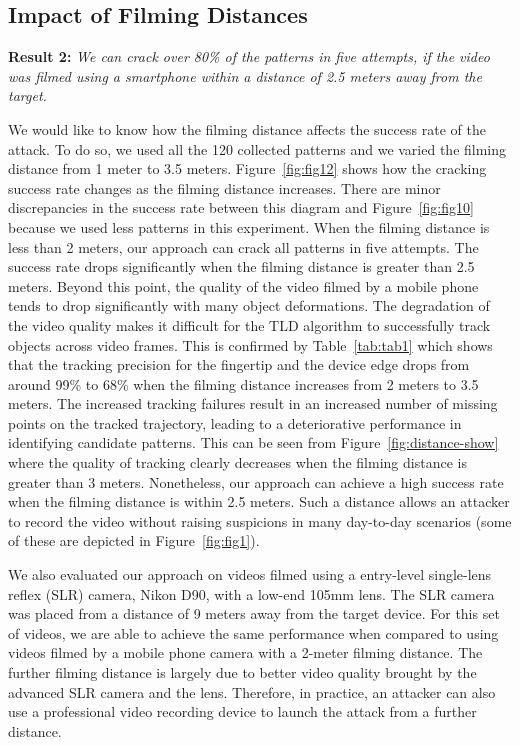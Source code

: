     \subsection{Impact of Filming Distances \label{sec:distances}}


        \noindent \textbf{Result 2:} \emph{We can crack over 80\% of the patterns in five attempts, if the video was filmed using a smartphone within a distance of 2.5 meters away from the target.}

           We would like to know how the filming distance affects the
           success rate of the attack. To do so, we used all the 120 collected patterns and we varied the
           filming distance from 1 meter to 3.5 meters.
           Figure~\ref{fig:fig12} shows how the cracking success rate changes
           as the filming distance increases. There are minor discrepancies in the success rate between this diagram and Figure~\ref{fig:fig10}
            because we used less patterns in this experiment.
           When the filming distance is less than 2 meters, our approach can crack all patterns in five attempts.
           The success rate drops significantly when
           the filming distance is greater than 2.5 meters.
           Beyond this point, the quality of the video filmed by a mobile phone tends to drop significantly with many object deformations. The degradation of the video quality makes it difficult for the TLD algorithm to successfully track objects across video frames.
            This is confirmed by Table~\ref{tab:tab1}
           which shows that the tracking precision for the fingertip and the device edge drops from around 99\% to
           68\% when the filming
           distance increases from 2 meters to 3.5 meters. The increased
           tracking failures result in an increased number of missing
           points on the tracked trajectory, leading to a deteriorative performance in identifying candidate patterns.
           This can be seen from Figure~\ref{fig:distance-show} where the quality
           of tracking clearly decreases when the filming distance is greater
           than 3 meters.
           Nonetheless, our approach can
           achieve a high success rate when the filming distance is within
           2.5 meters. Such a distance allows an attacker to
           record the video without raising suspicions in many day-to-day scenarios (some of these are
           depicted in Figure~\ref{fig:fig1}).

            We also evaluated our approach on videos filmed using a entry-level
            single-lens reflex (SLR) camera, Nikon D90, with a low-end 105mm lens. The SLR camera
            was placed from a distance of 9 meters away from the target
            device. For this set of videos, we are able to achieve the same
            performance when compared to using videos filmed by a mobile
            phone camera with a 2-meter filming distance. The further filming
            distance is largely due to better video quality brought by the advanced
            SLR camera and the lens. Therefore, in practice, an attacker can
            also use a professional video recording device to launch the
            attack from a further distance.

